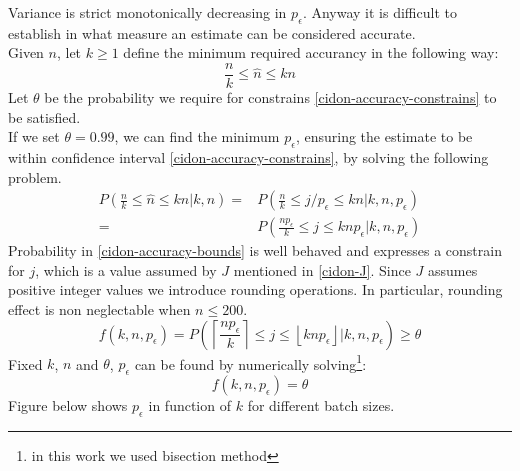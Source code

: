 \documentclass[12pt,a4paper]{report}
\newcommand{\pc}{p_{\epsilon}}
\begin{document}
Variance is strict monotonically decreasing in $\pc$.
Anyway it is difficult to establish in what measure an estimate can be considered accurate.\\
Given $n$, let $k \geq1$ define the minimum required accurancy in the following way: 
\begin{equation}
\frac{n}{k}\leq\hat{n}\leq kn
\label{cidon-accuracy-constrains}
\end{equation}
Let $\theta$ be the probability we require for constrains \eqref{cidon-accuracy-constrains} to be satisfied.\\
If we set $\theta=0.99$, we can find the minimum $\pc$, ensuring the estimate to be within confidence interval \eqref{cidon-accuracy-constrains}, by solving the following problem.\\
\begin{equation}
\begin{split}
P\left(\frac{n}{k}\leq \hat{n} \leq kn \big| k,n\right)=& P\left(\frac{n}{k}\leq j/\pc \leq kn \big| k,n,\pc\right)\\
=&P\left(\frac{n\pc}{k}\leq j \leq kn\pc \big| k,n,\pc\right)
\end{split}
\label{cidon-accuracy-bounds}
\end{equation}
Probability in \eqref{cidon-accuracy-bounds} is well behaved and expresses a constrain for $j$, which is a value assumed by $J$ mentioned in \eqref{cidon-J}. Since $J$ assumes positive integer values we introduce rounding operations. In particular, rounding effect is non neglectable when $n\leq 200$.  \\
\begin{equation}
f(k,n,\pc) = P\left(\left\lceil \frac{n\pc}{k}\right\rceil\leq j \leq \left\lfloor kn\pc\right\rfloor \big| k,n,\pc\right)\geq \theta
\end{equation}
Fixed $k$, $n$ and $\theta$, $\pc$ can be found by numerically solving\footnote{in this work we used bisection method}:
\begin{equation}
f(k,n,\pc) = \theta
\end{equation}
Figure below shows $\pc$ in function of $k$ for different batch sizes.\\
\end{document}
